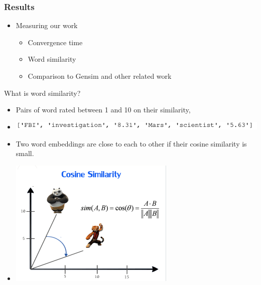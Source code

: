 \begin{frame}\frametitle{Results}
\begin{itemize}
\item Measuring our work
\begin{itemize}
\item Convergence time
\item Word similarity 
\item Comparison to Gensim and other related work
\end{itemize}
\end{itemize}
\end{frame}

\begin{frame}
\begin{Large}
What is word similarity? 
\end{Large}
\medskip
\begin{itemize}
\item Pairs of word rated between 1 and 10 on their similarity, 
\item \includegraphics[scale=0.5]{images/wordsim353_example}
\item Two word embeddings are close to each to other if their cosine similarity is small. 
\item \includegraphics[scale=0.7]{images/cosine}
\end{itemize}
\end{frame}

